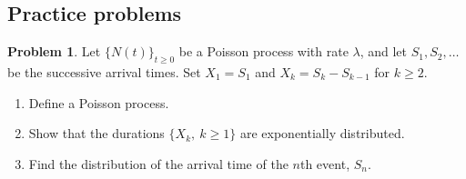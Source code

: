 \documentclass[11pt,a4paper]{article}
\theoremstyle{definition}
\newtheorem{problemx}{Problem}[subsection]
\newenvironment{problem}{\begin{problemx}}{\end{problemx}}
\begin{document}
\subsection{Practice problems}

\begin{problem}
Let $\{N(t)\}_{t\geq0}$ be a Poisson process with rate $\lambda$, and let
$S_1,S_2,\dots$ be the successive arrival times. Set $X_1=S_1$ and
$X_k=S_k-S_{k-1}$ for $k\geq2$.
\begin{enumerate}[label=(\alph*)]
\item Define a Poisson process.
\item Show that the durations $\{X_k,\ k\geq1\}$ are exponentially distributed.
\item Find the distribution of the arrival time of the $n$th event, $S_n$.
\end{enumerate}
\end{problem}
\end{document}
